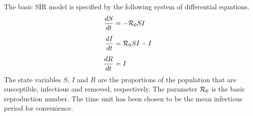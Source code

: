 \documentclass[12pt]{article}
\begin{document}
The basic SIR model is specified by the following system of differential equations.
\begin{subequations}
\begin{align}
\frac{dS}{dt} &= -\R_0 SI \\
\noalign{\vspace{5pt}}
\frac{dI}{dt} &= \R_0 SI - I \\
\noalign{\vspace{5pt}}
\frac{dR}{dt} &= I
\end{align}
\end{subequations}
The state variables $S$, $I$ and $R$ are the proportions of the population that are susceptible, infectious and removed, respectively.  The parameter ${\cal R}_0$ is the basic reproduction number.  The time unit has been chosen to be the mean infectious period for convenience.
\end{document}
